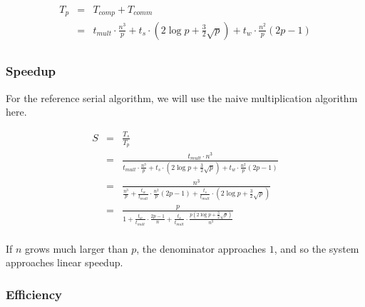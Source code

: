 \documentclass{article}
\begin{document}
\begin{eqnarray*}
T_p 	&=& T_{{comp}} + T_{{comm}} \\
		&=& t_{{mult}} \cdot \frac{n^3}{p} + t_s \cdot \left(2 \log{p} + \frac{3}{2} \sqrt{p}\right) + t_w \cdot \frac{n^2}{p}(2p-1) \\
\end{eqnarray*}

\subsubsection{Speedup}

For the reference serial algorithm, we will use the naive multiplication algorithm here.

\begin{eqnarray*}
S &=& \frac{T_s}{T_p} \\
&=& \frac{ t_{mult} \cdot n^3 }{ t_{mult} \cdot \frac{n^3}{p} + t_s \cdot \left(2 \log{p} + \frac{3}{2} \sqrt{p}\right) + t_w \cdot \frac{n^2}{p}(2p-1) } \\
&=& \frac{ n^3 }{ \frac{n^3}{p} + \frac{t_w}{t_{mult}} \cdot \frac{n^2}{p}(2p-1) + \frac{t_s}{t_{mult}} \cdot \left(2 \log{p} + \frac{3}{2} \sqrt{p}\right) } \\
&=& \frac{ p }{ 1 + \frac{t_w}{t_{mult}} \cdot \frac{2p-1}{n} + \frac{t_s}{t_{mult}} \cdot \frac{p\left(2 \log{p} + \frac{3}{2} \sqrt{p}\right)}{n^3} } \\
\end{eqnarray*}


If $n$ grows much larger than $p$, the denominator approaches $1$, and so the system approaches linear speedup.

\subsubsection{Efficiency}
\end{document}
